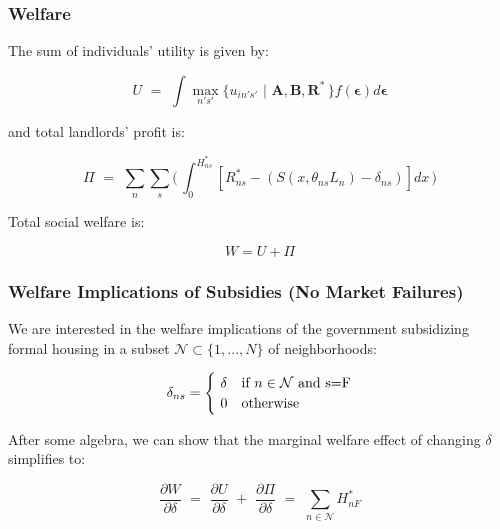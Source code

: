 \documentclass[aspectratio=149]{beamer}
\begin{document}
\begin{frame}
\frametitle{Welfare}

The sum of individuals' utility is given by:

\begin{equation*}
U \,\, =\,\, \int \max_{n's'}\{u_{in' s'}\,\,|\,\, \bm{A},\bm{B},\bm{R}^*\,\}f(\bm{\epsilon}) d\bm{\epsilon} 
\end{equation*}

\vspace{3mm}

\noindent and total landlords' profit is:

\begin{equation*}
\Pi \,\, =\,\, \sum_{n}\sum_{s} \Bigg(\,\int_0^{H^*_{ns}} [R^*_{ns} - (S(x,\theta_{ns}L_n) - \delta_{ns})]dx \, \Bigg) 
\end{equation*} 

\vspace{3mm}

Total social welfare is:

\begin{equation*}
W = U + \Pi
\end{equation*} 

\end{frame}


\begin{frame}
\frametitle{Welfare Implications of Subsidies (No Market Failures)}

We are interested in the welfare implications of the government subsidizing formal housing in a subset $\mathcal{N}\subset\{1,...,N\}$ of neighborhoods:

\vspace{2mm}

\begin{equation*}
 \delta_{ns} = \begin{cases} 
      \,\,\delta & \text{if}\,\, n\in\mathcal{N} \,\,\text{and}\,\, $s=F$ \\
      \,\,0 & \text{otherwise} 
   \end{cases}
\end{equation*} 

\vspace{2mm}

After some algebra, we can show that the marginal welfare effect of changing $\delta$ simplifies to: 

\vspace{2mm}

\begin{equation*}
\frac{\partial W}{\partial\delta} \,\,=\,\, \frac{\partial U}{\partial\delta} \,\,+\,\, \frac{\partial \Pi}{\partial\delta} \,\,=\,\, \sum_{n\in\mathcal{N}} H^*_{nF}
\end{equation*} 


\end{frame}
\end{document}
